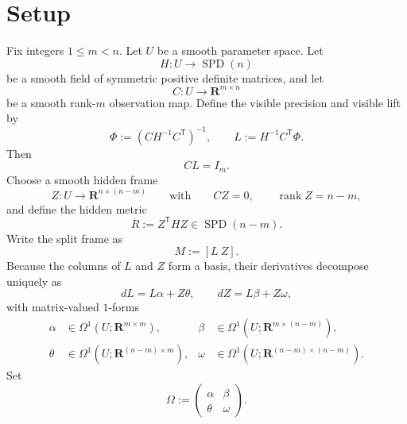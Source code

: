 \documentclass[11pt,a4paper]{article}
\numberwithin{equation}{section}
\newcommand{\R}{\mathbf R}
\theoremstyle{thmcompact}
\theoremstyle{remark}
\begin{document}
\section{Setup}

Fix integers $1\le m<n$. Let $U$ be a smooth parameter space. Let
\[
H:U\to \operatorname{SPD}(n)
\]
be a smooth field of symmetric positive definite matrices, and let
\[
C:U\to \R^{m\times n}
\]
be a smooth rank-$m$ observation map. Define the visible precision and visible lift by
\begin{equation}
\Phi:=(CH^{-1}C^{\mathsf T})^{-1},
\qquad
L:=H^{-1}C^{\mathsf T}\Phi.
\label{eq:visible-defs}
\end{equation}
Then
\[
CL=I_m.
\]
Choose a smooth hidden frame
\[
Z:U\to \R^{n\times(n-m)}
\qquad\text{with}\qquad
CZ=0,
\qquad \operatorname{rank} Z=n-m,
\]
and define the hidden metric
\begin{equation}
R:=Z^{\mathsf T}HZ\in \operatorname{SPD}(n-m).
\label{eq:hidden-metric}
\end{equation}
Write the split frame as
\[
M:=[L\ Z].
\]
Because the columns of $L$ and $Z$ form a basis, their derivatives decompose uniquely as
\begin{equation}
dL=L\alpha+Z\theta,
\qquad
dZ=L\beta+Z\omega,
\label{eq:split-derivatives}
\end{equation}
with matrix-valued $1$-forms
\[
\begin{aligned}
\alpha&\in\Omega^1(U;\R^{m\times m}),
&\beta&\in\Omega^1(U;\R^{m\times(n-m)}),\\
\theta&\in\Omega^1(U;\R^{(n-m)\times m}),
&\omega&\in\Omega^1(U;\R^{(n-m)\times(n-m)}).
\end{aligned}
\]
Set
\begin{equation}
\Omega:=
\begin{pmatrix}
\alpha & \beta\\
\theta & \omega
\end{pmatrix}.
\label{eq:Omega-def}
\end{equation}
\end{document}
